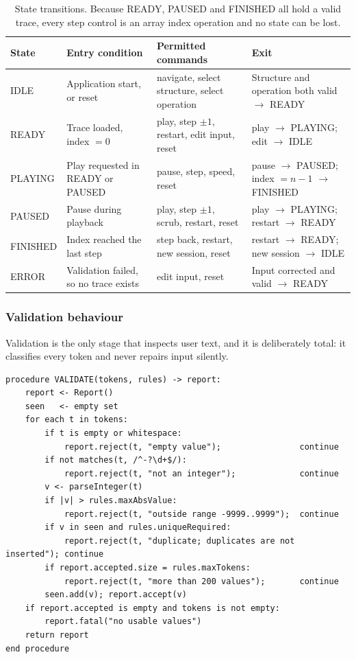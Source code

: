 \documentclass[11pt,a4paper]{article}
\begin{document}
\begin{table}[h]
\centering
\small
\begin{tabular}{@{}L{2.1cm}L{3.4cm}L{4.6cm}L{4.9cm}@{}}
\toprule
\textbf{State} & \textbf{Entry condition} & \textbf{Permitted commands} & \textbf{Exit} \\
\midrule
IDLE & Application start, or reset & navigate, select structure, select operation &
Structure and operation both valid $\rightarrow$ READY \\
READY & Trace loaded, index $=0$ & play, step $\pm 1$, restart, edit input, reset &
play $\rightarrow$ PLAYING; edit $\rightarrow$ IDLE \\
PLAYING & Play requested in READY or PAUSED & pause, step, speed, reset &
pause $\rightarrow$ PAUSED; index $= n-1$ $\rightarrow$ FINISHED \\
PAUSED & Pause during playback & play, step $\pm 1$, scrub, restart, reset &
play $\rightarrow$ PLAYING; restart $\rightarrow$ READY \\
FINISHED & Index reached the last step & step back, restart, new session, reset &
restart $\rightarrow$ READY; new session $\rightarrow$ IDLE \\
ERROR & Validation failed, so no trace exists & edit input, reset &
Input corrected and valid $\rightarrow$ READY \\
\bottomrule
\end{tabular}
\caption{State transitions. Because READY, PAUSED and FINISHED all hold a valid trace,
every step control is an array index operation and no state can be lost.}
\label{tab:sm}
\end{table}

\subsubsection{Validation behaviour}

Validation is the only stage that inspects user text, and it is deliberately total: it
classifies every token and never repairs input silently.

\begin{lstlisting}[style=pseudo,caption={The validation pipeline. Rejection is per token,
and the accepted list is the only thing that ever reaches the algorithm.},label={lst:validate}]
procedure VALIDATE(tokens, rules) -> report:
    report <- Report()
    seen   <- empty set
    for each t in tokens:
        if t is empty or whitespace:
            report.reject(t, "empty value");                continue
        if not matches(t, /^-?\d+$/):
            report.reject(t, "not an integer");             continue
        v <- parseInteger(t)
        if |v| > rules.maxAbsValue:
            report.reject(t, "outside range -9999..9999");  continue
        if v in seen and rules.uniqueRequired:
            report.reject(t, "duplicate; duplicates are not inserted"); continue
        if report.accepted.size = rules.maxTokens:
            report.reject(t, "more than 200 values");       continue
        seen.add(v); report.accept(v)
    if report.accepted is empty and tokens is not empty:
        report.fatal("no usable values")
    return report
end procedure
\end{lstlisting}
\end{document}
